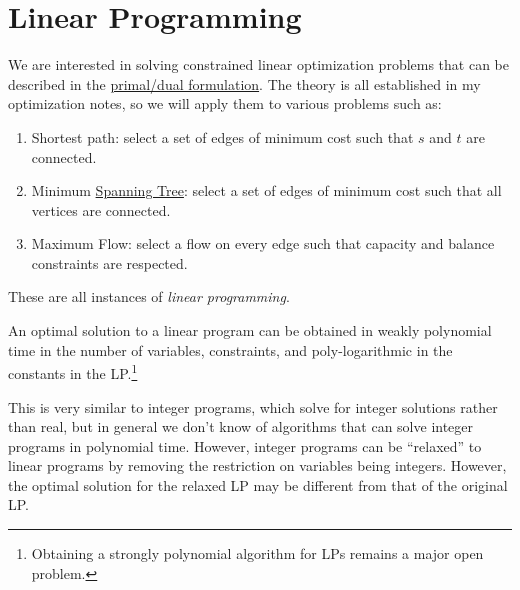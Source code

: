 \section{Linear Programming}

	We are interested in solving constrained linear optimization problems that can be described in the \hyperref[opt-def:primal_dual]{primal/dual formulation}. The theory is all established in my optimization notes, so we will apply them to various problems such as: 
  \begin{enumerate}
    \item Shortest path: select a set of edges of minimum cost such that $s$ and $t$ are connected. 
    \item Minimum \hyperref[def:spanning-tree]{Spanning Tree}: select a set of edges of minimum cost such that all vertices are connected. 
    \item Maximum Flow: select a flow on every edge such that capacity and balance constraints are respected. 
  \end{enumerate} 
	These are all instances of \textit{linear programming}. 

  \begin{theorem}[Optimality of LP]
    \label{thm:optimality-of-lp}
    An optimal solution to a linear program can be obtained in weakly polynomial time in the number of variables, constraints, and poly-logarithmic in the constants in the LP.\footnote{Obtaining a strongly polynomial algorithm for LPs remains a major open problem.} 
  \end{theorem} 

  This is very similar to integer programs, which solve for integer solutions rather than real, but in general we don't know of algorithms that can solve integer programs in polynomial time. However, integer programs can be ``relaxed'' to linear programs by removing the restriction on variables being integers. However, the optimal solution for the relaxed LP may be different from that of the original LP. 

  \begin{example}
    \label{ex:max-flow-as-lp}
    
  \end{example}

  \begin{example}
    \label{ex:bipartite-matching-as-lp}
    
  \end{example} 

